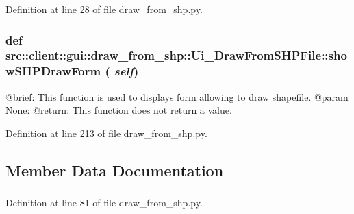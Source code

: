 Definition at line 28 of file draw\_\-from\_\-shp.py.

\hypertarget{classsrc_1_1client_1_1gui_1_1draw__from__shp_1_1Ui__DrawFromSHPFile_a463c120a1ab89fe4ce04d8f79077b1f5}{
\subsubsection[{showSHPDrawForm}]{\setlength{\rightskip}{0pt plus 5cm}def src::client::gui::draw\_\-from\_\-shp::Ui\_\-DrawFromSHPFile::showSHPDrawForm ( {\em self})}}
\label{classsrc_1_1client_1_1gui_1_1draw__from__shp_1_1Ui__DrawFromSHPFile_a463c120a1ab89fe4ce04d8f79077b1f5}
\begin{DoxyVerb}
@brief: This function is used to displays form allowing to draw shapefile.
@param None:
@return: This function does not return a value.
\end{DoxyVerb}
 

Definition at line 213 of file draw\_\-from\_\-shp.py.



\subsection{Member Data Documentation}
\hypertarget{classsrc_1_1client_1_1gui_1_1draw__from__shp_1_1Ui__DrawFromSHPFile_aa1f01b9e1ea91615e34325cf9ffb038a}{
\subsubsection[{cancel\_\-window}]{}}
\label{classsrc_1_1client_1_1gui_1_1draw__from__shp_1_1Ui__DrawFromSHPFile_aa1f01b9e1ea91615e34325cf9ffb038a}


Definition at line 81 of file draw\_\-from\_\-shp.py.

